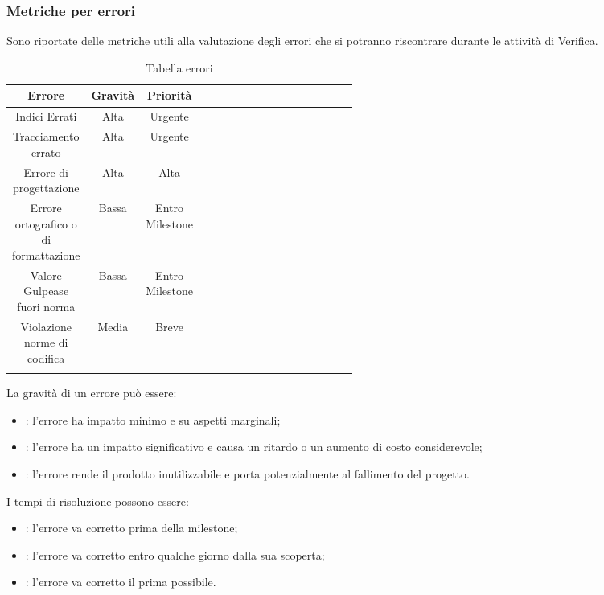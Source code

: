 \subsubsection{Metriche per errori}
Sono riportate delle metriche utili alla valutazione degli errori che si potranno riscontrare durante le attività di Verifica.
\begin{center}
\begin{longtable}{|c|c|c|p{0.5\linewidth}|}
\toprule
\textbf{Errore} & \textbf{Gravità} & \textbf{Priorità} \\

\midrule
Indici Errati & Alta & Urgente\\
\midrule
Tracciamento errato & Alta & Urgente\\
\midrule
Errore di progettazione & Alta & Alta\\
\midrule
Errore ortografico o di formattazione & Bassa & Entro Milestone\\
\midrule
Valore Gulpease fuori norma & Bassa & Entro Milestone\\
\midrule
Violazione norme di codifica & Media & Breve\\

\bottomrule
\caption{Tabella errori}
\label{tab:changelog}
\end{longtable}
\end{center}

La gravità di un errore può essere:

\begin{itemize}
\item {}: l'errore ha impatto minimo e su aspetti marginali;
\item {}: l'errore ha un impatto significativo e causa un ritardo o un aumento di costo considerevole;
\item {}: l'errore rende il prodotto inutilizzabile e porta potenzialmente al fallimento del progetto.
\end{itemize}

I tempi di risoluzione possono essere:
\begin{itemize}
\item {}: l'errore va corretto prima della milestone;
\item {}: l'errore va corretto entro qualche giorno dalla sua scoperta;
\item {}: l'errore va corretto il prima possibile.
\end{itemize}

